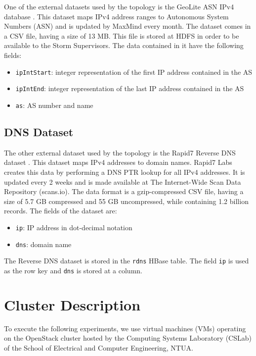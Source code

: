 One of the external datasets used by the topology is the GeoLite ASN IPv4 database \cite{geolite}. This dataset maps IPv4 address ranges to Autonomous System Numbers (ASN) and is updated by MaxMind every month. The dataset comes in a CSV file, having a size of 13 MB. This file is stored at HDFS in order to be available to the Storm Supervisors. The data contained in it have the following fields:
\begin{itemize}
\item \texttt{ipIntStart}: integer representation of the first IP address contained in the AS
\item \texttt{ipIntEnd}: integer representation of the last IP address contained in the AS
\item \texttt{as}: AS number and name
\end{itemize}

\subsection{DNS Dataset}\label{subsection:benchmarks_dns_dataset}

The other external dataset used by the topology is the Rapid7 Reverse DNS dataset \cite{rdns}. This dataset maps IPv4 addresses to domain names. Rapid7 Labs creates this data by performing a DNS PTR lookup for all IPv4 addresses. It is updated every 2 weeks and is made available at The Internet-Wide Scan Data Repository (scans.io). The data format is a gzip-compressed CSV file, having a size of 5.7 GB compressed and 55 GB uncompressed, while containing 1.2 billion records. The fields of the dataset are:
\begin{itemize}
\item \texttt{ip}: IP address in dot-decimal notation
\item \texttt{dns}: domain name
\end{itemize}

The Reverse DNS dataset is stored in the \texttt{rdns} HBase table. The field \texttt{ip} is used as the row key and \texttt{dns} is stored at a column.


\section{Cluster Description}

To execute the following experiments, we use virtual machines (VMs) operating on the OpenStack cluster hosted by the Computing Systems Laboratory (CSLab) of the School of Electrical and Computer Engineering, NTUA. 

